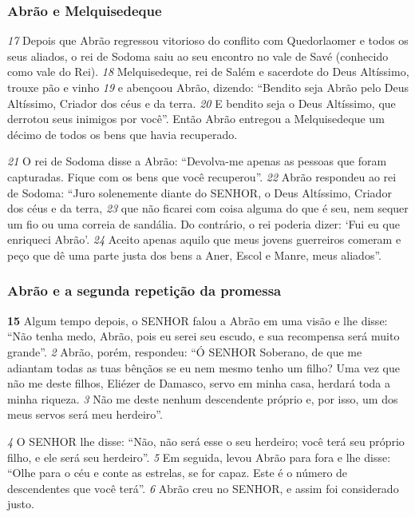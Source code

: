 \bigskip
\subsubsection*{Abrão e Melquisedeque}
\textit{\tiny 17}
Depois que Abrão regressou vitorioso do conflito com Quedorlaomer e todos os
seus aliados, o rei de Sodoma saiu ao seu encontro no vale de Savé (conhecido
como vale do Rei).
\textit{\tiny 18}
Melquisedeque, rei de Salém e sacerdote do Deus Altíssimo, trouxe pão e
vinho 
\textit{\tiny 19}
e abençoou Abrão, dizendo:
  “Bendito seja Abrão pelo Deus Altíssimo,
    Criador dos céus e da terra.
\textit{\tiny 20}
E bendito seja o Deus Altíssimo, que derrotou seus inimigos por você”.
Então Abrão entregou a Melquisedeque um décimo de todos os bens que havia
recuperado.

\bigskip
\textit{\tiny 21}
O rei de Sodoma disse a Abrão: “Devolva-me apenas as pessoas que foram
capturadas. Fique com os bens que você recuperou”.
\textit{\tiny 22}
Abrão respondeu ao rei de Sodoma: “Juro solenemente diante do SENHOR, o
Deus Altíssimo, Criador dos céus e da terra, 
\textit{\tiny 23}
que não ficarei com coisa alguma
do que é seu, nem sequer um fio ou uma correia de sandália. Do contrário, o rei
poderia dizer: ‘Fui eu que enriqueci Abrão’. 
\textit{\tiny 24}
Aceito apenas aquilo que meus
jovens guerreiros comeram e peço que dê uma parte justa dos bens a Aner, Escol e
Manre, meus aliados”.

\bigskip
\subsubsection*{Abrão e a segunda repetição da promessa}
\textbf{\large 15}
 Algum tempo depois, o SENHOR falou a Abrão em uma visão e lhe disse:
“Não tenha medo, Abrão, pois eu serei seu escudo, e sua recompensa será muito
grande”.
\textit{\tiny 2}
Abrão, porém, respondeu: “Ó SENHOR Soberano, de que me adiantam todas as
tuas bênçãos se eu nem mesmo tenho um filho? Uma vez que não me deste filhos,
Eliézer de Damasco, servo em minha casa, herdará toda a minha riqueza. 
\textit{\tiny 3}
Não me
deste nenhum descendente próprio e, por isso, um dos meus servos será meu
herdeiro”.

\bigskip
\textit{\tiny 4}
O SENHOR lhe disse: “Não, não será esse o seu herdeiro; você terá seu próprio
filho, e ele será seu herdeiro”. 
\textit{\tiny 5}
Em seguida, levou Abrão para fora e lhe disse:
“Olhe para o céu e conte as estrelas, se for capaz. Este é o número de
descendentes que você terá”.
\textit{\tiny 6}
Abrão creu no SENHOR, e assim foi considerado justo.

